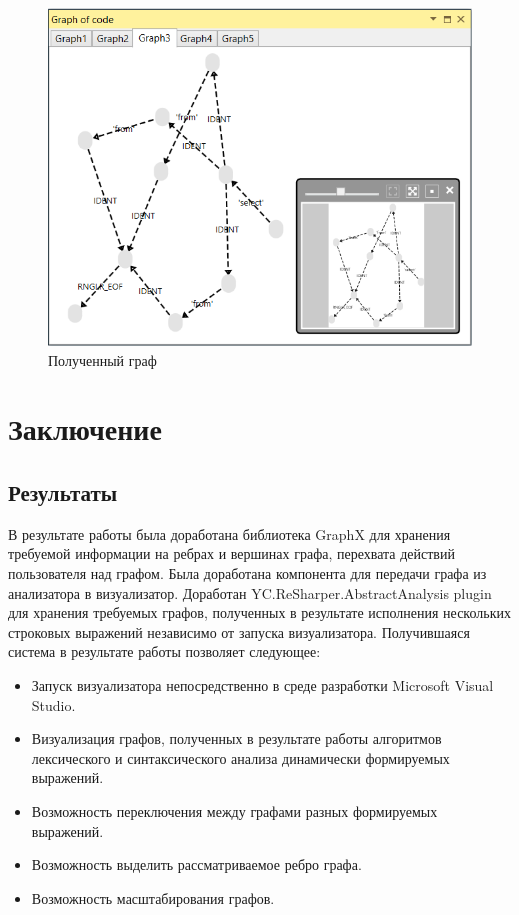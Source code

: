 \documentclass{matmex-diploma}
\begin{document}
\begin{figure}[h]
\label{Hard}
\centering
\includegraphics[width=\textwidth]{StrongGraph.PNG}
\caption{Полученный граф}
\end{figure}

\newpage{}
\section*{Заключение}
\subsection*{Результаты}
В результате работы была доработана библиотека GraphX для хранения требуемой информации на ребрах и вершинах графа, перехвата действий пользователя над графом. Была доработана компонента для передачи графа из анализатора в визуализатор. Доработан YC.ReSharper.AbstractAnalysis plugin для хранения требуемых графов, полученных в результате исполнения нескольких строковых выражений независимо от запуска визуализатора. Получившаяся система в результате работы позволяет следующее:

\begin{itemize}

         \item { Запуск визуализатора непосредственно в среде разработки Microsoft Visual Studio.}
        \item { Визуализация графов, полученных в результате работы алгоритмов  лексического и синтаксического анализа динамически формируемых выражений.
}
       \item { Возможность переключения между графами разных формируемых выражений. }
       \item {Возможность выделить рассматриваемое ребро графа.}
       \item {Возможность масштабирования графов.}
\end{itemize}
\end{document}
